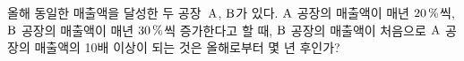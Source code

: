 올해 동일한 매출액을 달성한 두 공장~$\mathrm{A}$, $\mathrm{B}$가 있다. $\mathrm{A}$ 공장의 매출액이 매년 $20\mkern3mu \%$씩, $\mathrm{B}$ 공장의 매출액이 매년 $30\mkern3mu \%$씩 증가한다고 할 때, $\mathrm{B}$ 공장의 매출액이 처음으로 $\mathrm{A}$ 공장의 매출액의 10배 이상이 되는 것은 올해로부터 몇 년 후인가? 
